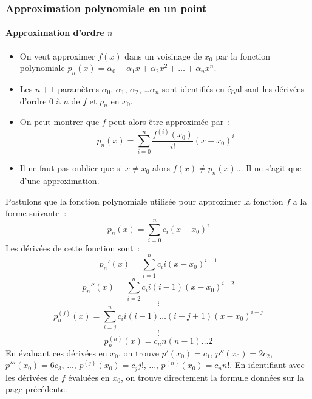 \documentclass[10pt,notheorems]{beamer}
\theoremstyle{plain}
\theoremstyle{definition} %
\begin{document}
\begin{frame}
  \frametitle{Approximation polynomiale en un point}
  \framesubtitle{Approximation d'ordre $n$}
  \hypertarget{slide_taylor_7}{}

  \bigskip

  \begin{itemize}

  \item On veut approximer $f(x)$ dans un voisinage de $x_0$ par la fonction polynomiale $p_n(x) = \alpha_0+\alpha_1 x + \alpha_2 x^2 +\ldots+ \alpha_n x^n$.\newline

  \item Les $n+1$ paramètres $\alpha_0$, $\alpha_1$, $\alpha_2$, \ldots $\alpha_n$ sont identifiés en égalisant les dérivées d'ordre 0 à $n$ de $f$ et $p_n$ en $x_0$.\newline

  \item On peut montrer que $f$ peut alors être approximée par~:
    \[
      p_n(x) = \sum_{i=0}^n\frac{f^{(i)}(x_0)}{i!}(x-x_0)^i
    \]

  \item[\dbend] Il ne faut pas oublier que si $x\neq x_0$ alors $f(x)\neq p_n(x)$... Il ne s'agit que d'une approximation.
  \end{itemize}

\end{frame}


\begin{notes}
  Postulons que la fonction polynomiale utilisée pour approximer la fonction $f$ a la forme suivante~:
  \[
    p_n(x) = \sum_{i=0}^n c_i (x-x_0)^i
  \]
  Les dérivées de cette fonction sont~:
  \[
    p_n'(x) = \sum_{i=1}^nc_i i (x-x_0)^{i-1}
  \]
  \[
    p_n''(x) = \sum_{i=2}^nc_i i (i-1)(x-x_0)^{i-2}
  \]
  \[
    \vdots
  \]
  \[
    p_n^{(j)}(x) = \sum_{i=j}^nc_i i (i-1)\ldots(i-j+1)(x-x_0)^{i-j}
  \]
  \[
    \vdots
  \]
  \[
    p_n^{(n)}(x) = c_n n (n-1) \ldots 2
  \]
  En évaluant ces dérivées en $x_0$, on trouve $p'(x_0)=c_1$, $p''(x_0)=2c_2$, $p'''(x_0)=6c_3$, ..., $p^{(j)}(x_0) = c_j j!$, ..., $p^{(n)}(x_0) = c_n n!$. En identifiant avec les dérivées de $f$ évaluées en $x_0$, on trouve directement la formule données sur la page précédente.
\end{notes}
\end{document}
